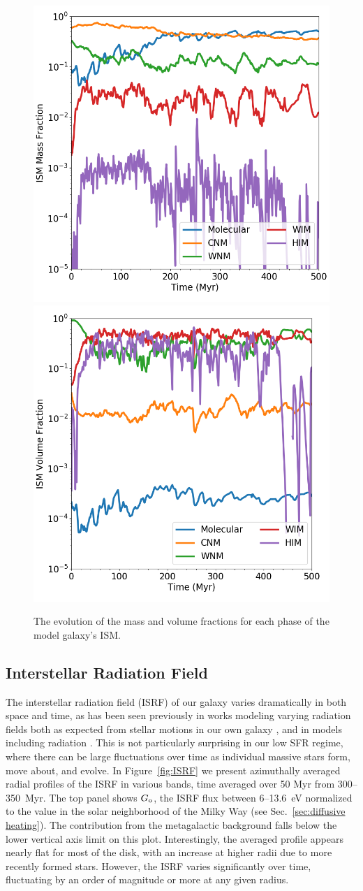 \documentclass[twocolumn]{aastex61}
\begin{document}
\begin{figure}
\centering
\includegraphics[width=0.45\linewidth]{phase_mass_fraction_evolution_log.png}
\includegraphics[width=0.45\linewidth]{phase_volume_fraction_evolution_log.png}
\caption{The evolution of the mass and volume fractions for each phase of the model galaxy's ISM.}
\label{fig:ISM_evolution}
\end{figure}

\subsection{Interstellar Radiation Field}
\label{sec:ISRF}

The interstellar radiation field (ISRF) of our galaxy varies dramatically in both space and time, as has been seen previously in works modeling varying radiation fields both as expected from stellar motions in our own galaxy \citep{Parravano2003}, and in models including radiation \citep[e.g.][]{Hu2017}. This is not particularly surprising in our low SFR regime, where there can be large fluctuations over time as individual massive stars form, move about, and evolve. In Figure~\ref{fig:ISRF} we present azimuthally averaged radial profiles of the ISRF in various bands, time averaged over 50 Myr from 300--350~Myr. The top panel shows $G_{\rm o}$, the ISRF flux between 6--13.6~eV normalized to the value in the solar neighborhood of the Milky Way (see Sec.~\ref{sec:diffusive heating}). The contribution from the metagalactic background falls below the lower vertical axis limit on this plot. Interestingly, the averaged profile appears nearly flat for most of the disk, with an increase at higher radii due to more recently formed stars. However, the ISRF varies significantly over time, fluctuating by an order of magnitude or more at any given radius. 
\end{document}
